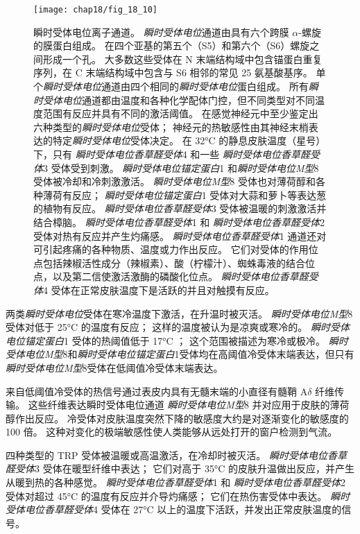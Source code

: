 \begin{figure}[htbp]
	\centering
	\texttt{[image: chap18/fig\_18\_10]}
	\caption{瞬时受体电位离子通道。
		\textit{瞬时受体电位}通道由具有六个跨膜 $\alpha$-螺旋的膜蛋白组成。
		在四个亚基的第五个（S5）和第六个（S6）螺旋之间形成一个孔。
		大多数这些受体在 N 末端结构域中包含锚蛋白重复序列，在 C 末端结构域中包含与 S6 相邻的常见 25 氨基酸基序。
		单个\textit{瞬时受体电位}通道由四个相同的\textit{瞬时受体电位}蛋白组成。
		所有\textit{瞬时受体电位}通道都由温度和各种化学配体门控，但不同类型对不同温度范围有反应并具有不同的激活阈值。
		在感觉神经元中至少鉴定出六种类型的\textit{瞬时受体电位}受体； 神经元的热敏感性由其神经末梢表达的特定\textit{瞬时受体电位}受体决定。
		在 32°C 的静息皮肤温度（星号）下，只有 \textit{瞬时受体电位香草醛受体}4 和一些 \textit{瞬时受体电位香草醛受体}3 受体受到刺激。
		\textit{瞬时受体电位锚定蛋白}1 和\textit{瞬时受体电位M型}8 受体被冷却和冷刺激激活。
		\textit{瞬时受体电位M型}8 受体也对薄荷醇和各种薄荷有反应；
		\textit{瞬时受体电位锚定蛋白}1 受体对大蒜和萝卜等表达葱的植物有反应。
		\textit{瞬时受体电位香草醛受体}3 受体被温暖的刺激激活并结合樟脑。
		\textit{瞬时受体电位香草醛受体}1 和 \textit{瞬时受体电位香草醛受体}2 受体对热有反应并产生灼痛感。 
		\textit{瞬时受体电位香草醛受体}1 通道还对可引起疼痛的各种物质、温度或力作出反应。
		它们对受体的作用位点包括辣椒活性成分（辣椒素）、酸（柠檬汁）、蜘蛛毒液的结合位点，以及第二信使激活激酶的磷酸化位点。
		\textit{瞬时受体电位香草醛受体}4 受体在正常皮肤温度下是活跃的并且对触摸有反应\cite{jordt2003lessons}。}
	\label{fig:18_10}
\end{figure}


两类\textit{瞬时受体电位}受体在寒冷温度下激活，在升温时被灭活。
\textit{瞬时受体电位M型}8 受体对低于 25°C 的温度有反应； 这样的温度被认为是凉爽或寒冷的。
\textit{瞬时受体电位锚定蛋白}1 受体的热阈值低于 17°C ；
这个范围被描述为寒冷或极冷。
\textit{瞬时受体电位M型}8和\textit{瞬时受体电位锚定蛋白}1受体均在高阈值冷受体末端表达，但只有\textit{瞬时受体电位M型}8受体在低阈值冷受体末端表达。


来自低阈值冷受体的热信号通过表皮内具有无髓末端的小直径有髓鞘 A$\delta$ 纤维传输。
这些纤维表达瞬时受体电位通道 \textit{瞬时受体电位M型}8 并对应用于皮肤的薄荷醇作出反应。
冷受体对皮肤温度突然下降的敏感度大约是对逐渐变化的敏感度的 100 倍。
这种对变化的极端敏感性使人类能够从远处打开的窗户检测到气流。


四种类型的 TRP 受体被温暖或高温激活，在冷却时被灭活。
\textit{瞬时受体电位香草醛受体}3 受体在暖型纤维中表达； 它们对高于 35°C 的皮肤升温做出反应，并产生从暖到热的各种感觉。
\textit{瞬时受体电位香草醛受体}1 和 \textit{瞬时受体电位香草醛受体}2 受体对超过 45°C 的温度有反应并介导灼痛感；
它们在热伤害受体中表达。 
\textit{瞬时受体电位香草醛受体}4 受体在 27°C 以上的温度下活跃，并发出正常皮肤温度的信号。


